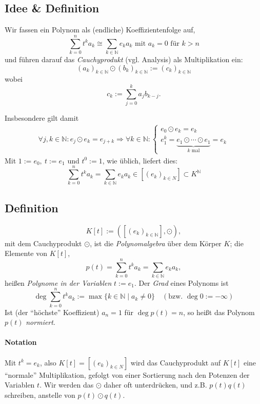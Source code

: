 \subsection{Idee \& Definition} 
	\begin{Definition}[Cauchyprodukt]
		Wir fassen ein Polynom als (endliche) Koeffizientenfolge auf,
		\[ \sum_{k=0}^{n} t^ka_k \cong
		\sum_{k\in \mathbb{N}}e_ka_k \text{ mit } a_k = 0 \text{ für } k>n \]
	und führen darauf das \emph{Cauchyprodukt} (vgl. Analysis) als Multiplikation ein:
		\[ (a_k)_{k\in \mathbb{N}} \odot (b_k)_{k\in \mathbb{N}} := (c_k)_{k\in \mathbb{N}} \]
	wobei
		\[ c_k := \sum_{j=0}^{k}a_jb_{k-j}. \]
	\end{Definition}
	Insbesondere gilt damit
		\begin{gather*}
		\forall j,k\in \mathbb{N}: e_j \odot e_k = e_{j+k}
		\Rightarrow \forall k\in \mathbb{N}:
			\begin{cases}
				e_0 \odot e_k = e_k\\
				e_1^k = \underset{k \text{ mal}}{\underbrace{e_1 \odot \cdots \odot e_1}} = e_k
			\end{cases}
		\end{gather*}
	Mit $ 1:= e_0,\ t:= e_1 $ und $ t^0 := 1 $, wie üblich, liefert dies:
		\[ \sum_{k=0}^{n}t^ka_k = \sum_{k\in \mathbb{N}}e_ka_k \in [(e_k)_{k\in N}]\subset K^\mathbb{N} \]
\subsection{Definition}
		\begin{Definition}[Polynomalgebra]
			\[ K[t] := ([(e_k)_{k\in \mathbb{N}}],\odot) ,\]
	mit dem Cauchyprodukt $ \odot $, ist die \emph{Polynomalgebra} über dem Körper $ K $; die Elemente von $ K[t] $,
		\[ p(t) = \sum_{k=0}^{n}t^ka_k = \sum_{k\in\mathbb{N}}e_ka_k, \]
	heißen \emph{Polynome in der Variablen} $ t:= e_1 $.
	Der \emph{Grad} eines Polynoms ist
		\[  \deg\sum_{k=0}^{n}t^ka_k := \max \{k\in \mathbb{N}\mid a_k \neq 0\}  \quad \left( \text{bzw. } \deg 0 := -\infty \right) \]
	Ist (der "`höchste"' Koeffizient) $ a_n = 1 $ für $ \deg p(t) = n $, so heißt das Polynom $ p(t) $ \emph{normiert}.
		\end{Definition}
\paragraph{Notation}
	Mit $t^k = e_{k}$, also $ K[t] = [(e_k)_{k\in N}] $
	wird das Cauchyprodukt auf $ K[t] $ eine "`normale"' Multiplikation, gefolgt von einer Sortierung nach den Potenzen der Variablen $ t $. Wir werden das $ \odot $ daher oft unterdrücken, und z.B. $ p(t)q(t) $ schreiben, anstelle von $ p(t) \odot q(t) $.
